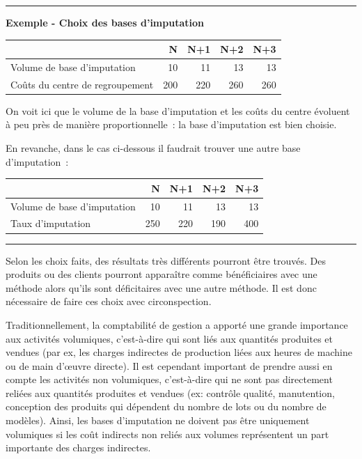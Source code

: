 \documentclass[oneside]{kaobook}
\begin{document}
\noindent\rule{\textwidth}{0.5pt}
\textbf{Exemple - Choix des bases d'imputation}

\begin{center}
\begin{tabular}{lrrrr}
 & N & N+1 & N+2 & N+3\\
\hline
Volume de base d'imputation & 10 & 11 & 13 & 13\\
Coûts du centre de regroupement & 200 & 220 & 260 & 260\\
\end{tabular}
\end{center}

On voit ici que le volume de la base d'imputation et les coûts du centre évoluent à peu près de manière proportionnelle : la base d'imputation est bien choisie.

En revanche, dans le cas ci-dessous il faudrait trouver une autre base d'imputation :

\begin{center}
\begin{tabular}{lrrrr}
 & N & N+1 & N+2 & N+3\\
\hline
Volume de base d'imputation & 10 & 11 & 13 & 13\\
Taux d'imputation & 250 & 220 & 190 & 400\\
\end{tabular}
\end{center}

\noindent\rule{\textwidth}{0.5pt}

Selon les choix faits, des résultats très différents pourront être trouvés. Des produits ou des clients pourront apparaître comme bénéficiaires avec une méthode alors qu'ils sont déficitaires avec une autre méthode. Il est donc nécessaire de faire ces choix avec circonspection.

\begin{kaobox}
Traditionnellement, la comptabilité de gestion a apporté une grande importance aux activités volumiques, c'est-à-dire qui sont liés aux quantités produites et vendues (par ex, les charges indirectes de production liées aux heures de machine ou de main d’œuvre directe). Il est cependant important de prendre aussi en compte les activités non volumiques, c'est-à-dire qui ne sont pas directement reliées aux quantités produites et vendues (ex: contrôle qualité, manutention, conception des produits qui dépendent du nombre de lots ou du nombre de modèles).
Ainsi, les bases d’imputation ne doivent pas être uniquement volumiques si les coût indirects non reliés aux volumes représentent un part importante des charges indirectes.
\end{kaobox}
\end{document}

